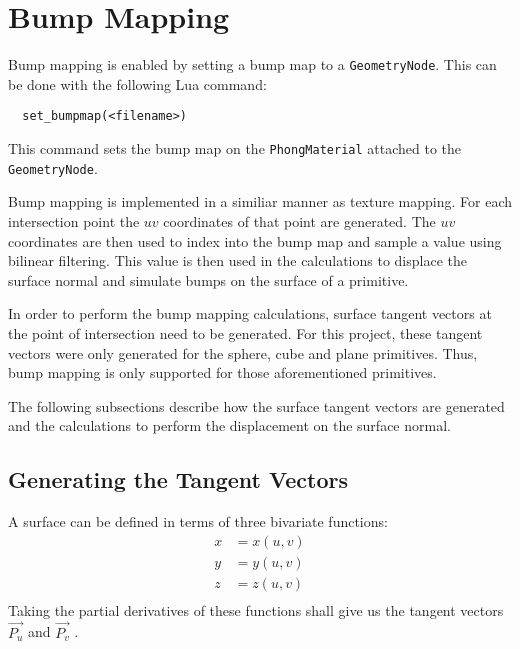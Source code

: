 \section{Bump Mapping}

Bump mapping is enabled by setting a bump map to a \verb|GeometryNode|. This can
be done with the following Lua command:
\begin{lstlisting}
  set_bumpmap(<filename>)
\end{lstlisting}
This command sets the bump map on the \verb|PhongMaterial| attached to the
\verb|GeometryNode|.

Bump mapping is implemented in a similiar manner as texture mapping. For each
intersection point the $uv$ coordinates of that point are generated. The $uv$
coordinates are then used to index into the bump map and sample a value
using bilinear filtering. This value is then used in the calculations to
displace the surface normal and simulate bumps on the surface of a primitive.

In order to perform the bump mapping calculations, surface tangent vectors at
the point of intersection need to be generated. For this project, these tangent
vectors were only generated for the sphere, cube and plane primitives. Thus,
bump mapping is only supported for those aforementioned primitives.

The following subsections describe how the surface tangent vectors are generated
and the calculations to perform the displacement on the surface normal.

\subsection{Generating the Tangent Vectors}
A surface can be defined in terms of three bivariate functions:
\begin{equation}
\begin{split}
  x &= x(u, v) \\
  y &= y(u, v) \\
  z &= z(u, v) \\
\end{split}
\end{equation}
Taking the partial derivatives of these functions shall give us the tangent
vectors $\vec{P_{u}}$ and $\vec{P_{v}}$ \cite{1_blinn_1978}.

